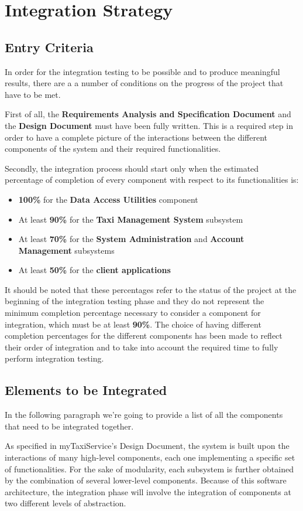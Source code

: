 \chapter{Integration Strategy}
\section{Entry Criteria}
In order for the integration testing to be possible and to produce meaningful results, there are a a number of conditions on the progress of the project that have to be met.

First of all, the \textbf{Requirements Analysis and Specification Document} and the \textbf{Design Document} must have been fully written. This is a required step in order to have a complete picture of the interactions between the different components of the system and their required functionalities. 

Secondly, the integration process should start only when the estimated percentage of completion of every component with respect to its functionalities is:
\begin{itemize}
	\item \textbf{100\%} for the \textbf{Data Access Utilities} component
	\item At least \textbf{90\%} for the \textbf{Taxi Management System} subsystem
	\item At least \textbf{70\%} for the \textbf{System Administration} and \textbf{Account Management} subsystems
	\item At least \textbf{50\%} for the \textbf{client applications}
\end{itemize} 
It should be noted that these percentages refer to the status of the project at the beginning of the integration testing phase and they do not represent the minimum completion percentage necessary to consider a component for integration, which must be at least \textbf{90\%}. The choice of having different completion percentages for the different components has been made to reflect their order of integration and to take into account the required time to fully perform integration testing.

\section{Elements to be Integrated}
In the following paragraph we're going to provide a list of all the components that need to be integrated together.

As specified in myTaxiService's Design Document, the system is built upon the interactions of many high-level components, each one implementing a specific set of functionalities. For the sake of modularity, each subsystem is further obtained by the combination of several lower-level components.
Because of this software architecture, the integration phase will involve the integration of components at two different levels of abstraction. 

